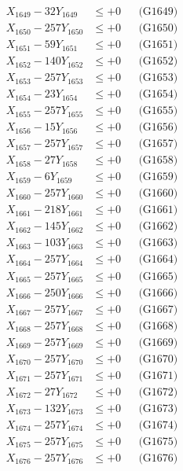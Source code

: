 \documentclass[a4paper,10pt]{article}
\begin{document}
{\begin{align}
X_{1649} - 32Y_{1649} &\leq +0 && \text{(G1649)} \\
X_{1650} - 257Y_{1650} &\leq +0 && \text{(G1650)} \\
\allowbreak
X_{1651} - 59Y_{1651} &\leq +0 && \text{(G1651)} \\
X_{1652} - 140Y_{1652} &\leq +0 && \text{(G1652)} \\
X_{1653} - 257Y_{1653} &\leq +0 && \text{(G1653)} \\
X_{1654} - 23Y_{1654} &\leq +0 && \text{(G1654)} \\
X_{1655} - 257Y_{1655} &\leq +0 && \text{(G1655)} \\
X_{1656} - 15Y_{1656} &\leq +0 && \text{(G1656)} \\
X_{1657} - 257Y_{1657} &\leq +0 && \text{(G1657)} \\
X_{1658} - 27Y_{1658} &\leq +0 && \text{(G1658)} \\
X_{1659} - 6Y_{1659} &\leq +0 && \text{(G1659)} \\
X_{1660} - 257Y_{1660} &\leq +0 && \text{(G1660)} \\
\allowbreak
X_{1661} - 218Y_{1661} &\leq +0 && \text{(G1661)} \\
X_{1662} - 145Y_{1662} &\leq +0 && \text{(G1662)} \\
X_{1663} - 103Y_{1663} &\leq +0 && \text{(G1663)} \\
X_{1664} - 257Y_{1664} &\leq +0 && \text{(G1664)} \\
X_{1665} - 257Y_{1665} &\leq +0 && \text{(G1665)} \\
X_{1666} - 250Y_{1666} &\leq +0 && \text{(G1666)} \\
X_{1667} - 257Y_{1667} &\leq +0 && \text{(G1667)} \\
X_{1668} - 257Y_{1668} &\leq +0 && \text{(G1668)} \\
X_{1669} - 257Y_{1669} &\leq +0 && \text{(G1669)} \\
X_{1670} - 257Y_{1670} &\leq +0 && \text{(G1670)} \\
\allowbreak
X_{1671} - 257Y_{1671} &\leq +0 && \text{(G1671)} \\
X_{1672} - 27Y_{1672} &\leq +0 && \text{(G1672)} \\
X_{1673} - 132Y_{1673} &\leq +0 && \text{(G1673)} \\
X_{1674} - 257Y_{1674} &\leq +0 && \text{(G1674)} \\
X_{1675} - 257Y_{1675} &\leq +0 && \text{(G1675)} \\
X_{1676} - 257Y_{1676} &\leq +0 && \text{(G1676)} \\

\end{align}}
\end{document}
